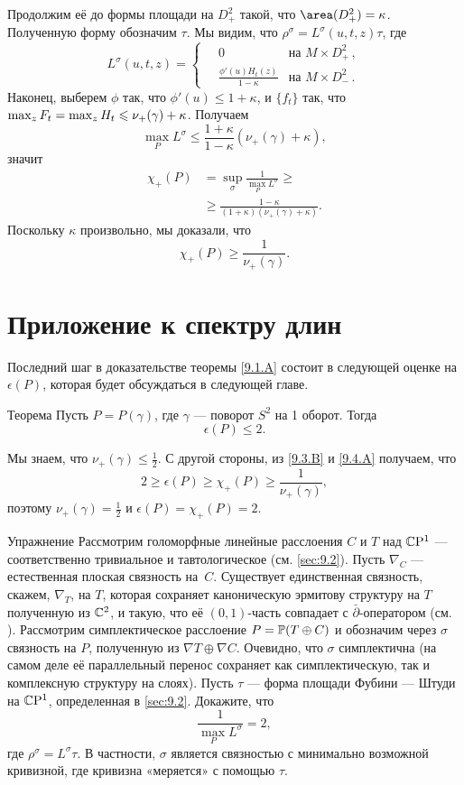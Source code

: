 Продолжим её до формы площади на $D_+^2$ такой, что $\area (D_+^2) = \kappa$.
Полученную форму обозначим $\tau$.
Мы видим, что $\rho^\sigma = L^\sigma (u, t, z)\tau$, где 
\[
L^\sigma(u,t,z)=
\begin{cases}
\quad0&\text{на\ } M\times D^2_+\,,
\\
\quad\frac{\phi'(u)H_t(z)}{1-\kappa}&\text{на\ } M\times D^2_-\,.
\end{cases}
\]
Наконец, выберем $\phi$ так, что $\phi' (u) \le 1 + \kappa$, и
$\{f_t\}$ так, что $\max_z F_t \z= \max_z H_t \le \nu_+ (\gamma) +
\kappa$. 
Получаем
\[\max_P L^\sigma \le  \frac{1+\kappa}{1-\kappa} (\nu_+ (\gamma) + \kappa),\]
значит 
\begin{align*}
\chi_+ (P) &= \sup_\sigma \frac1{\max_PL^\sigma}\ge
\\
&\ge\frac{1-\kappa}{(1 + \kappa)(\nu_+ (\gamma) + \kappa)}. 
\end{align*}
Поскольку $\kappa$ произвольно, мы доказали, что 
\[\chi_+ (P) \ge \frac{1}{\nu_+ (\gamma)}.\]
\qeds

\section{Приложение к спектру длин}\label{sec:9.4}

Последний шаг в доказательстве теоремы \ref{9.1.A} состоит в следующей
оценке на $\epsilon(P)$, которая будет обсуждаться в следующей главе.


\begin{thm}{Теорема}\label{9.4.A}
Пусть $P = P(\gamma)$, где $\gamma$ — поворот $S^2$ на 1 оборот.
Тогда
\[\epsilon(P) \le 2.\]
\end{thm}

Мы знаем, что $\nu_+ (\gamma) \le \tfrac12$.
С другой стороны, из \ref{9.3.B} и \ref{9.4.A} получаем, что
\[2 \ge \epsilon(P) \ge \chi_+ (P) \ge\frac1{\nu_+(\gamma)},\]
поэтому $\nu_+ (\gamma) = \tfrac12$ и $\epsilon(P) = \chi_+ (P) = 2$.
\qeds

\begin{ex}{Упражнение}
Рассмотрим голоморфные линейные расслоения $C$ и $T$ над $\mathbb{C}\mathrm{P}^1$ —
соответственно тривиальное и тавтологическое (см. \ref{sec:9.2}). 
Пусть $\nabla_C$ — естественная плоская связность на~$C$.
Существует единственная связность, скажем, $\nabla_T$, на $T$, которая
сохраняет каноническую эрмитову структуру  на $T$ полученную из
$\mathbb{C}^2$, и такую, что её $(0,1)$-часть совпадает с
$\bar\partial$-оператором (см. \cite{GH}). 
Рассмотрим симплектическое расслоение $P = \mathbb{P}(T \oplus C)$ и
обозначим через $\sigma$ связность на $P$, полученную из $\nabla T
\oplus \nabla C$. 
Очевидно, что $\sigma$ симплектична (на самом деле её параллельный
перенос сохраняет как симплектическую, так и комплексную структуру на
слоях). 
Пусть $\tau$ — форма площади Фубини — Штуди на $\mathbb{C}\mathrm{P}^1$,
определенная в \ref{sec:9.2}. 
Докажите, что 
\[\frac1{\max_P L^\sigma}=2,\]
где $\rho^\sigma = L^\sigma \tau$.
В частности, $\sigma$ является связностью с минимально возможной
кривизной, где кривизна «меряется» с  помощью $\tau$.  
\end{ex}
